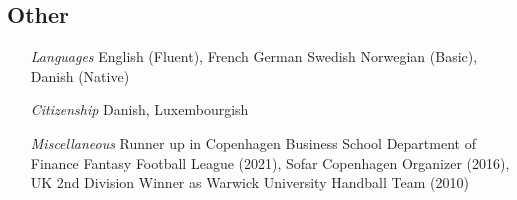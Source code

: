 \documentclass[11pt]{res} %
\newcommand{\fullhrulefill}{%
  \vspace{-1ex}%
  \hspace*{-\sectionwidth}\hrulefill%
  }
\begin{document}
\begin{resume}
 
\vspace{0.2in} %

\section{Other}
\fullhrulefill \newline
%
\vspace{-2ex}
\begin{itemize}
\setlength{\itemindent}{3.5em}
\item[\emph{Languages}]  English (Fluent), French German Swedish Norwegian (Basic), Danish (Native)
\item[\emph{Citizenship} ] 
Danish, Luxembourgish
\item[\emph{Miscellaneous}] Runner up in Copenhagen Business School Department of Finance Fantasy Football \phantom{xxxxxx} League (2021), Sofar Copenhagen Organizer (2016), %
UK 2nd Division Winner as \phantom{xxxxxx} Warwick University Handball Team (2010)
\end{itemize}

 

\vspace{0.2in} %


\end{resume}
\end{document}
